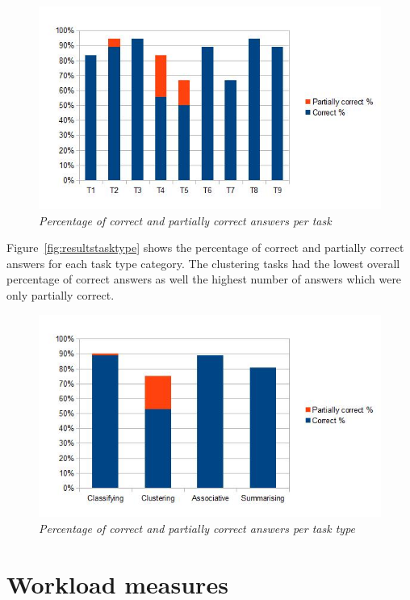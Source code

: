 \begin{figure}[!htb]
	\centering
	\includegraphics[scale=0.70]{resultstask.jpg}
	\caption{\textit{Percentage of correct and partially correct answers per task}}
	\label{fig:resultstask}
\end{figure}

Figure~\vref{fig:resultstasktype} shows the percentage of correct and partially correct answers for each task type category. The clustering tasks had the lowest overall percentage of correct answers as well the highest number of answers which were only partially correct.

\begin{figure}[!htb]
	\centering
	\includegraphics[scale=0.70]{resultstasktype.jpg}
	\caption{\textit{Percentage of correct and partially correct answers per task type}}
	\label{fig:resultstasktype}
\end{figure}

\section{Workload measures}

